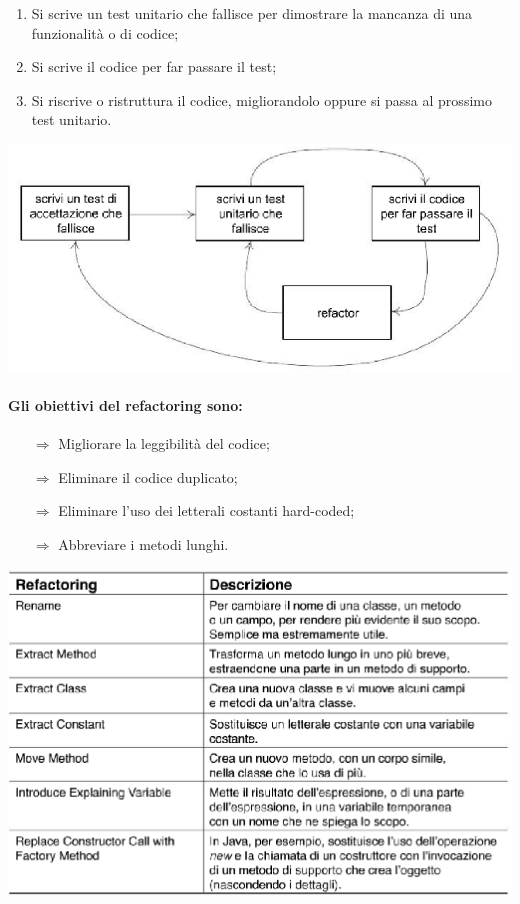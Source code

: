 \begin{enumerate}
    \item Si scrive un test unitario che fallisce per dimostrare
    la mancanza di una funzionalità o di codice;
    \item Si scrive il codice per far passare il test;
    \item Si riscrive o ristruttura il codice, migliorandolo oppure si
    passa al prossimo test unitario.
\end{enumerate}

\begin{center}
    \includegraphics[scale=0.35]{images/Test.png}
\end{center}

\paragraph{Gli obiettivi del refactoring sono:}

\begin{itemize}
    \item [$\Rightarrow$] Migliorare la leggibilità del codice;
    \item [$\Rightarrow$] Eliminare il codice duplicato;
    \item [$\Rightarrow$] Eliminare l'uso dei letterali costanti hard-coded;
    \item [$\Rightarrow$] Abbreviare i metodi lunghi.
\end{itemize}

\begin{center}
    \includegraphics[scale=0.4]{images/Refactoring.png}
\end{center}


